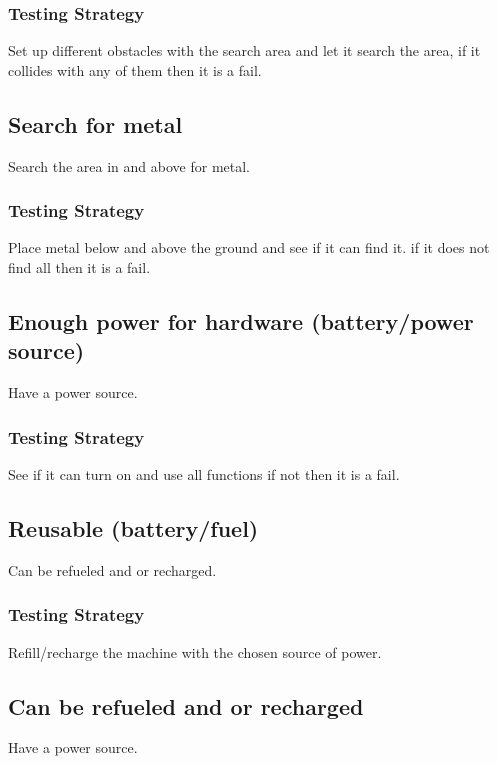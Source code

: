 \subsubsection*{Testing Strategy}
Set up different obstacles with the search area and let it search the area, if it collides with any of them then it is a fail.


\subsection{Search for metal}\label{R5}
Search the area in and above for metal. 

\subsubsection*{Testing Strategy}
Place metal below and above the ground and see if it can find it. if it does not find all then it is a fail.

 
\subsection{Enough power for hardware (battery/power source)}\label{R6}
Have a power source.

\subsubsection*{Testing Strategy}
See if it can turn on and use all functions if not then it is a fail.


\subsection{Reusable (battery/fuel)}\label{R7}
Can be refueled and or recharged.

\subsubsection*{Testing Strategy}
Refill/recharge the machine with the chosen source of power.


\subsection{Can be refueled and or recharged}\label{R8}
Have a power source.

